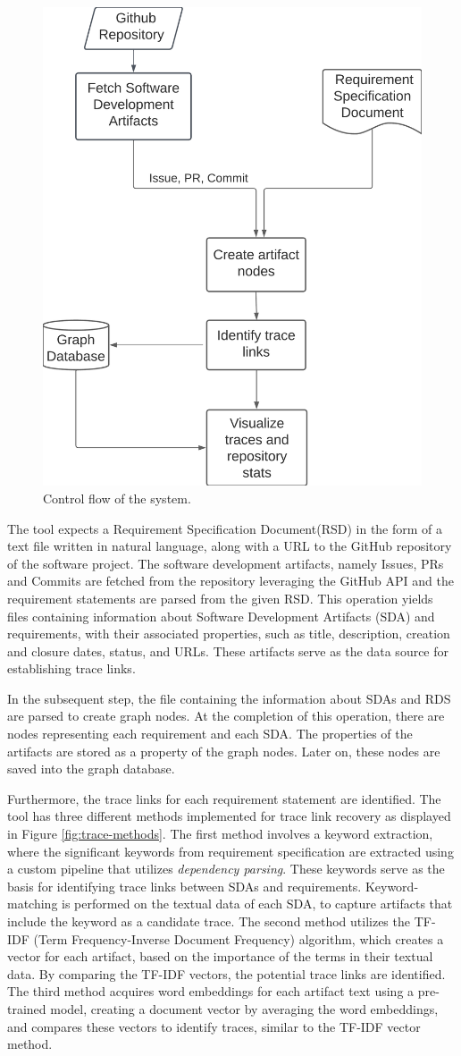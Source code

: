 \documentclass[conference]{IEEEtran}
\begin{document}
\begin{figure}[htb]
    \centering
    \includegraphics[width=0.45\linewidth]{figs/toolflow.png}
    \caption{Control flow of the system.}
    \label{fig:sys-flow}
\end{figure}

The tool expects a Requirement Specification Document(RSD) in the form of a text file written in natural language, along with a URL to the GitHub repository of the software project. The software development artifacts, namely Issues, PRs and Commits are fetched from the repository leveraging the GitHub API
and the requirement statements are parsed from the given RSD. This operation yields files containing information about Software Development Artifacts (SDA) and requirements, with their associated properties, such as title, description, creation and closure dates, status, and URLs. These artifacts serve as the data source for establishing trace links.

In the subsequent step, the file containing the information about SDAs and RDS are parsed to create graph nodes. At the completion of this operation, there are nodes representing each requirement and each SDA. The properties of the artifacts are stored as a property of the graph nodes. Later on, these nodes are saved into the graph database.

Furthermore, the trace links for each requirement statement are identified. The tool has three different methods implemented for trace link recovery as displayed in Figure \ref{fig:trace-methods}. The first method involves a keyword extraction, where the significant keywords from requirement specification are extracted using a custom pipeline that utilizes \textit{dependency parsing}. These keywords serve as the basis for identifying trace links between SDAs and requirements. Keyword-matching is performed on the textual data of each SDA, to capture artifacts that include the keyword as a candidate trace. The second method utilizes the TF-IDF (Term Frequency-Inverse Document Frequency) algorithm, which creates a vector for each artifact, based on the importance of the terms in their textual data. By comparing the TF-IDF vectors, the potential trace links are identified. The third method acquires word embeddings for each artifact text using a pre-trained model, creating a document vector by averaging the word embeddings, and compares these vectors to identify traces, similar to the TF-IDF vector method. 
\end{document}
